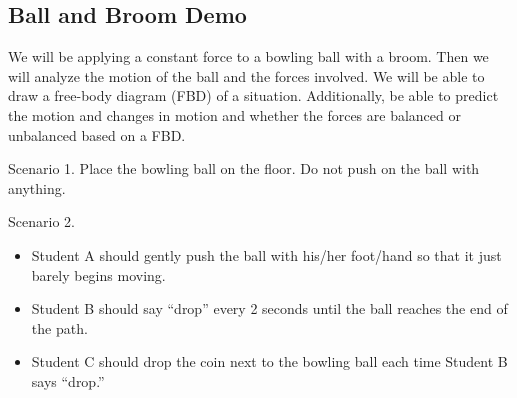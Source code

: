 \documentclass[answers]{exam}
\begin{document}
\subsection*{Ball and Broom Demo}

We will be applying a constant force to a bowling ball with a broom. Then we will analyze the motion of the ball and the forces involved. We will be able to draw a free-body diagram (FBD) of a situation. Additionally, be able to predict the motion and changes in motion and whether the forces are balanced or unbalanced based on a FBD.

\begin{questions}

\question
Scenario 1. Place the bowling ball on the floor. Do not push on the ball with anything.


\question
Scenario 2.

\begin{itemize}[itemsep=0pt,topsep=0pt]
    \item Student A should gently push the ball with his/her foot/hand so that it just barely begins moving.
    \item Student B should say ``drop'' every 2 seconds until the ball reaches the end of the path.
    \item Student C should drop the coin next to the bowling ball each time Student B says ``drop.''
\end{itemize}

\medskip

\begin{parts}

\end{parts}
\end{questions}
\end{document}
